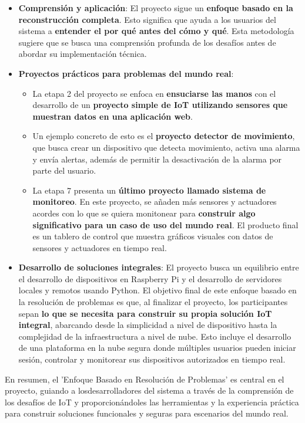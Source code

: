 \documentclass{report}
\begin{document}
\begin{itemize}
    \item \textbf{Comprensión y aplicación}: El proyecto sigue un \textbf{enfoque basado en la reconstrucción completa}. Esto significa 
    que ayuda a los usuarios del sistema a \textbf{entender el por qué antes del cómo y qué}. Esta metodología sugiere que se busca 
    una comprensión profunda de los desafíos antes de abordar su implementación técnica.

    \item \textbf{Proyectos prácticos para problemas del mundo real}:
    \begin{itemize}
        \item La etapa 2 del proyecto se enfoca en \textbf{ensuciarse las manos} con el desarrollo de un \textbf{proyecto simple de IoT 
        utilizando sensores que muestran datos en una aplicación web}.
        \item Un ejemplo concreto de esto es el \textbf{proyecto detector de movimiento}, que busca crear un 
        dispositivo que detecta movimiento, activa una alarma y envía alertas, además de permitir la desactivación 
        de la alarma por parte del usuario.
        \item La etapa 7 presenta un \textbf{último proyecto llamado sistema de monitoreo}. En este proyecto, se añaden más sensores y 
        actuadores acordes con lo que se quiera monitonear para \textbf{construir algo significativo para un caso de uso del mundo real}. 
        El producto final es un tablero de control que muestra gráficos visuales con datos de sensores y actuadores en tiempo real.
    \end{itemize}

    \item \textbf{Desarrollo de soluciones integrales}: El proyecto busca un equilibrio entre el desarrollo de dispositivos en Raspberry Pi 
    y el desarrollo de servidores locales y remotos usando Python. El objetivo final de este enfoque basado en la resolución de problemas es 
    que, al finalizar el proyecto, los participantes sepan \textbf{lo que se necesita para construir su propia solución IoT integral}, 
    abarcando desde la simplicidad a nivel de dispositivo hasta la complejidad de la infraestructura a nivel de nube. Esto incluye el 
    desarrollo de una plataforma en la nube segura donde múltiples usuarios pueden iniciar sesión, controlar y monitorear sus dispositivos 
    autorizados en tiempo real.
\end{itemize}
En resumen, el 'Enfoque Basado en Resolución de Problemas' es central en el proyecto, guiando a losdesarrolladores del sistema a través 
de la comprensión de los desafíos de IoT y proporcionándoles las herramientas y la experiencia práctica para construir soluciones funcionales 
y seguras para escenarios del mundo real.
\end{document}
